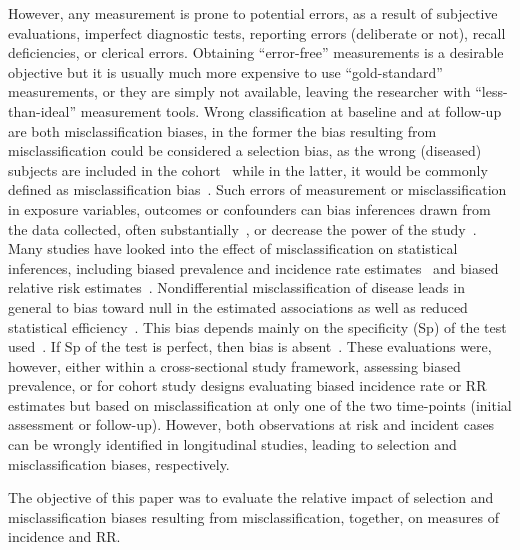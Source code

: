 However, any measurement is prone to potential errors, as a result of subjective
evaluations, imperfect diagnostic tests, reporting errors (deliberate or not),
recall deficiencies, or clerical errors.
Obtaining ``error-free'' measurements is a desirable objective but it is
usually much more expensive to use ``gold-standard'' measurements, or they
are simply not available, leaving the researcher with ``less-than-ideal''
measurement tools.
Wrong classification at baseline and at follow-up are both misclassification
biases, in the former the bias resulting from misclassification could be
considered a selection bias, as the wrong (diseased) subjects are included in
the cohort~\citep{Rothman2012} while in the latter, it would be commonly defined
as misclassification bias~\citep{Delgado-Rodriguez2004}.
Such errors of measurement or misclassification in exposure variables, outcomes
or confounders can bias inferences drawn from the data collected, often
substantially~\citep{Quade1980}, or decrease the power of the
study~\citep{Bross1954,WHITE_1986}.
Many studies have looked into the effect of misclassification on statistical
inferences, including biased prevalence and incidence rate
estimates~\citep{Rogan1978,Quade1980} and biased relative risk
estimates~\citep{Barron1977,Greenland1980}.
Nondifferential misclassification of disease leads in general to bias toward
null in the estimated associations as well as reduced statistical
efficiency~\citep{Bross1954,Barron1977,Copeland1977}.
This bias depends mainly on the specificity (Sp) of the test
used~\citep{Copeland1977}.
If Sp of the test is perfect, then bias is absent~\citep{Poole1985}.
These evaluations were, however, either within a cross-sectional study
framework, assessing biased prevalence, or for cohort study designs evaluating
biased incidence rate or RR estimates but based on misclassification at only one
of the two time-points (initial assessment or follow-up).
However, both observations at risk and incident cases can be wrongly identified
in longitudinal studies, leading to selection and misclassification biases,
respectively.

The objective of this paper was to evaluate the relative impact of selection and
misclassification biases resulting from misclassification, together, on measures
of incidence and RR.

